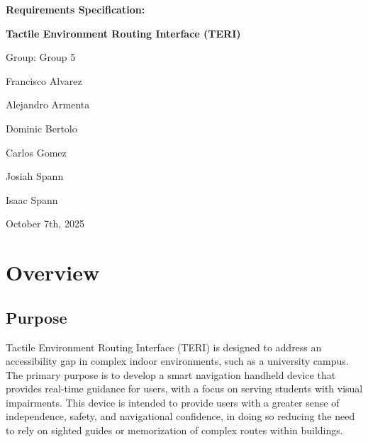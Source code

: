 \documentclass{article}
\begin{document}
\begin{titlepage}
    \centering
    
    \vspace*{\fill}
    
    {\Huge\bfseries Requirements Specification: \par}
    {\Huge\bfseries Tactile Environment Routing Interface (TERI)\par}
    
    \vspace{2cm}
    
    {\Large Group: Group 5\par}
    \vspace{1cm}
    {\large Francisco Alvarez\par}
    {\large Alejandro Armenta\par}
    {\large Dominic Bertolo\par}
    {\large Carlos Gomez\par}
    {\large Josiah Spann\par}
    {\large Isaac Spann\par}
    
    \vspace{1.5cm}
    
    {\large October 7th, 2025\par}
    
    \vspace*{\fill}
\end{titlepage}

\section{Overview}

\subsection{Purpose}
Tactile Environment Routing Interface (TERI) is designed to address an accessibility gap in complex indoor environments, such as a university campus. The primary purpose is to develop a smart navigation handheld device that provides real-time guidance for users, with a focus on serving students with visual impairments. This device is intended to provide users with a greater sense of independence, safety, and navigational confidence, in doing so reducing the need to rely on sighted guides or memorization of complex routes within buildings.
\end{document}
